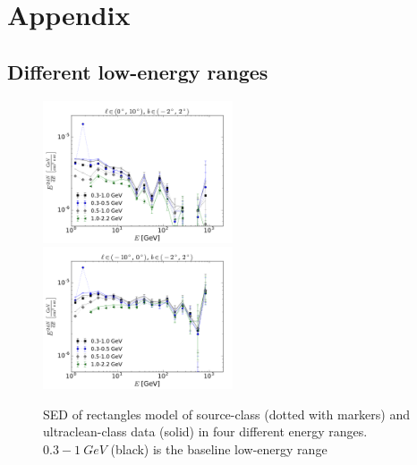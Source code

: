 \section{Appendix}

\subsection{Different low-energy ranges}

\begin{figure}[h]
\includegraphics[width=0.5\textwidth]{plots/SED_different_lowE_ranges_boxes_l=5_b=0.pdf}
\includegraphics[width=0.5\textwidth]{plots/SED_different_lowE_ranges_boxes_l=-5_b=0.pdf}
  	\caption{SED of rectangles model of source-class (dotted with markers) and ultraclean-class data (solid) in four different energy ranges. $0.3 - \SI{1}{GeV}$ (black) is the baseline low-energy range}
  	\label{fig:Profiles}
\end{figure}